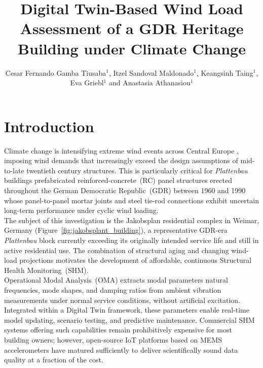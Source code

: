 \documentclass{eurodyn2026}
\title{Digital Twin-Based Wind Load Assessment of a GDR Heritage Building
       under Climate Change}
\author{Cesar Fernando Gamba Tiusaba$^1$, Itzel Sandoval Maldonado$^1$, Keangsinh Taing$^1$, Eva Griebl$^1$
        and Anastasia Athanasiou$^1$}
\begin{document}

\section{Introduction}


\noindent Climate change is intensifying extreme wind events 
across Central Europe \cite{nhess-24-1555-2024}, imposing wind 
demands that increasingly exceed the design assumptions of 
mid-to-late twentieth century structures. This is particularly 
critical for \textit{Plattenbau} buildings 
prefabricated reinforced-concrete~(RC) panel structures 
erected throughout the German Democratic Republic~(GDR) between 1960 and 1990 
whose panel-to-panel mortar joints and steel tie-rod 
connections exhibit uncertain long-term performance under cyclic wind loading.\\

\noindent The subject of this investigation is 
the Jakobsplan residential complex in Weimar, 
Germany (Figure~\ref{fig:jakobsplant_building}), 
a representative GDR-era \textit{Plattenbau} block 
currently exceeding its originally intended service 
life and still in active residential use. The combination 
of structural aging and changing wind-load 
projections motivates the development of affordable, 
continuous Structural Health Monitoring~(SHM).\\

\noindent Operational Modal Analysis~(OMA) extracts modal parameters 
natural frequencies, mode shapes, and damping ratios 
from ambient vibration measurements under normal service conditions, 
without artificial excitation. Integrated within a Digital Twin framework, 
these parameters enable real-time model updating, scenario testing, 
and predictive maintenance. Commercial SHM systems offering such 
capabilities remain prohibitively expensive for most building owners; 
however, open-source IoT platforms based on MEMS accelerometers 
have matured sufficiently to deliver scientifically sound data quality 
at a fraction of the cost.\\



\end{document}

